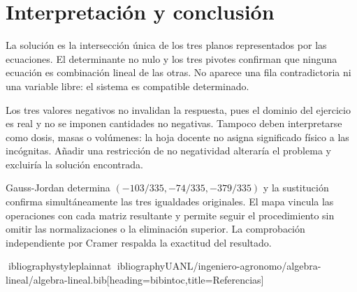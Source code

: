 \documentclass[spanish,letterpaper,oneside]{article}
\begin{document}
\section{Interpretación y conclusión}
La solución es la intersección única de los tres planos representados por las
ecuaciones. El determinante no nulo y los tres pivotes confirman que ninguna
ecuación es combinación lineal de las otras. No aparece una fila contradictoria
ni una variable libre: el sistema es compatible determinado.

Los tres valores negativos no invalidan la respuesta, pues el dominio del
ejercicio es real y no se imponen cantidades no negativas. Tampoco deben
interpretarse como dosis, masas o volúmenes: la hoja docente no asigna
significado físico a las incógnitas. Añadir una restricción de no negatividad
alteraría el problema y excluiría la solución encontrada.

Gauss-Jordan determina $(-103/335,-74/335,-379/335)$ y la sustitución confirma
simultáneamente las tres igualdades originales. El mapa vincula las operaciones
con cada matriz resultante y permite seguir el procedimiento sin omitir las
normalizaciones o la eliminación superior. La comprobación independiente
por Cramer respalda la exactitud del resultado.

ibliographystyle{plainnat}
ibliography{UANL/ingeniero-agronomo/algebra-lineal/algebra-lineal.bib}[heading=bibintoc,title={Referencias}]
\end{document}
